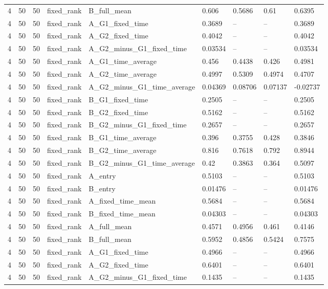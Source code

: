 \begin{longtable}{lllllllll}
4 & 50 & 50 & fixed\_rank & B\_full\_mean & 0.606 & 0.5686 & 0.61 & 0.6395 \\
4 & 50 & 50 & fixed\_rank & A\_G1\_fixed\_time & 0.3689 & -- & -- & 0.3689 \\
4 & 50 & 50 & fixed\_rank & A\_G2\_fixed\_time & 0.4042 & -- & -- & 0.4042 \\
4 & 50 & 50 & fixed\_rank & A\_G2\_minus\_G1\_fixed\_time & 0.03534 & -- & -- & 0.03534 \\
4 & 50 & 50 & fixed\_rank & A\_G1\_time\_average & 0.456 & 0.4438 & 0.426 & 0.4981 \\
4 & 50 & 50 & fixed\_rank & A\_G2\_time\_average & 0.4997 & 0.5309 & 0.4974 & 0.4707 \\
4 & 50 & 50 & fixed\_rank & A\_G2\_minus\_G1\_time\_average & 0.04369 & 0.08706 & 0.07137 & -0.02737 \\
4 & 50 & 50 & fixed\_rank & B\_G1\_fixed\_time & 0.2505 & -- & -- & 0.2505 \\
4 & 50 & 50 & fixed\_rank & B\_G2\_fixed\_time & 0.5162 & -- & -- & 0.5162 \\
4 & 50 & 50 & fixed\_rank & B\_G2\_minus\_G1\_fixed\_time & 0.2657 & -- & -- & 0.2657 \\
4 & 50 & 50 & fixed\_rank & B\_G1\_time\_average & 0.396 & 0.3755 & 0.428 & 0.3846 \\
4 & 50 & 50 & fixed\_rank & B\_G2\_time\_average & 0.816 & 0.7618 & 0.792 & 0.8944 \\
4 & 50 & 50 & fixed\_rank & B\_G2\_minus\_G1\_time\_average & 0.42 & 0.3863 & 0.364 & 0.5097 \\
4 & 50 & 50 & fixed\_rank & A\_entry & 0.5103 & -- & -- & 0.5103 \\
4 & 50 & 50 & fixed\_rank & B\_entry & 0.01476 & -- & -- & 0.01476 \\
4 & 50 & 50 & fixed\_rank & A\_fixed\_time\_mean & 0.5684 & -- & -- & 0.5684 \\
4 & 50 & 50 & fixed\_rank & B\_fixed\_time\_mean & 0.04303 & -- & -- & 0.04303 \\
4 & 50 & 50 & fixed\_rank & A\_full\_mean & 0.4571 & 0.4956 & 0.461 & 0.4146 \\
4 & 50 & 50 & fixed\_rank & B\_full\_mean & 0.5952 & 0.4856 & 0.5424 & 0.7575 \\
4 & 50 & 50 & fixed\_rank & A\_G1\_fixed\_time & 0.4966 & -- & -- & 0.4966 \\
4 & 50 & 50 & fixed\_rank & A\_G2\_fixed\_time & 0.6401 & -- & -- & 0.6401 \\
4 & 50 & 50 & fixed\_rank & A\_G2\_minus\_G1\_fixed\_time & 0.1435 & -- & -- & 0.1435 \\

\end{longtable}
